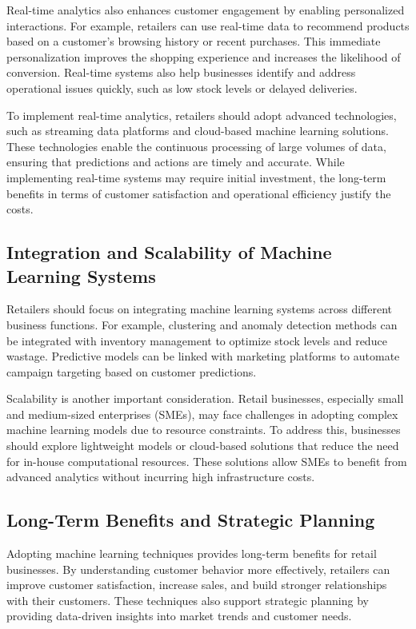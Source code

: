\documentclass[12pt, a4paper,twoside]{report}
\theoremstyle{plain} %
\theoremstyle{definition} %
\theoremstyle{remark} %
\numberwithin{equation}{chapter}
\begin{document}
Real-time analytics also enhances customer engagement by enabling personalized interactions. For example, retailers can use real-time data to recommend products based on a customer’s browsing history or recent purchases. This immediate personalization improves the shopping experience and increases the likelihood of conversion. Real-time systems also help businesses identify and address operational issues quickly, such as low stock levels or delayed deliveries.

To implement real-time analytics, retailers should adopt advanced technologies, such as streaming data platforms and cloud-based machine learning solutions. These technologies enable the continuous processing of large volumes of data, ensuring that predictions and actions are timely and accurate. While implementing real-time systems may require initial investment, the long-term benefits in terms of customer satisfaction and operational efficiency justify the costs.

\subsection{Integration and Scalability of Machine Learning Systems}

Retailers should focus on integrating machine learning systems across different business functions. For example, clustering and anomaly detection methods can be integrated with inventory management to optimize stock levels and reduce wastage. Predictive models can be linked with marketing platforms to automate campaign targeting based on customer predictions.

Scalability is another important consideration. Retail businesses, especially small and medium-sized enterprises (SMEs), may face challenges in adopting complex machine learning models due to resource constraints. To address this, businesses should explore lightweight models or cloud-based solutions that reduce the need for in-house computational resources. These solutions allow SMEs to benefit from advanced analytics without incurring high infrastructure costs.

\subsection{Long-Term Benefits and Strategic Planning}

Adopting machine learning techniques provides long-term benefits for retail businesses. By understanding customer behavior more effectively, retailers can improve customer satisfaction, increase sales, and build stronger relationships with their customers. These techniques also support strategic planning by providing data-driven insights into market trends and customer needs.
\end{document}
